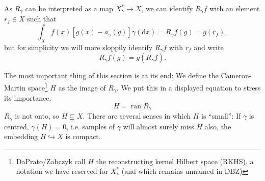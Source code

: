 \documentclass{scrartcl}
\theoremstyle{definition}
\theoremstyle{remark}
\newcommand{\de}{\mathrm d}
\begin{document}
As $R_\gamma$ can be interpreted as a map $X_\gamma^* \to X$, we can identify $R_\gamma f$ with an element $r_f\in X$ such that 
\begin{equation}\label{eq:reconstructingkernel}
\int_X f(x) [g(x)-a_\gamma(g)]\gamma(\de x) = R_\gamma f(g) = g(r_f),
\end{equation}
but for simplicity we will more sloppily identify $R_\gamma f$ with $r_f$ and write
\[ R_\gamma f(g) = g(R_\gamma f).\]



The most important thing of this section is at its end: We define the Cameron-Martin space\footnote{DaPrato/Zabczyk call $H$ the reconstructing kernel Hilbert space (RKHS), a notation we have reserved for $X_\gamma^*$ (and which remains unnamed in DBZ)} $H$ as the image of $R_\gamma$. We put this in a displayed equation to stress its importance.
\begin{displaymath}
H = \operatorname{ran} R_\gamma
\end{displaymath}
$R_\gamma$ is not onto, so $H\subsetneq X$. There are several senses in which $H$ is ``small'': If $\gamma$ is centred, $\gamma(H) = 0$, i.e. samples of $\gamma$ will almost surely miss $H$ also, the embedding $H\hookrightarrow X$ is compact.
\end{document}
